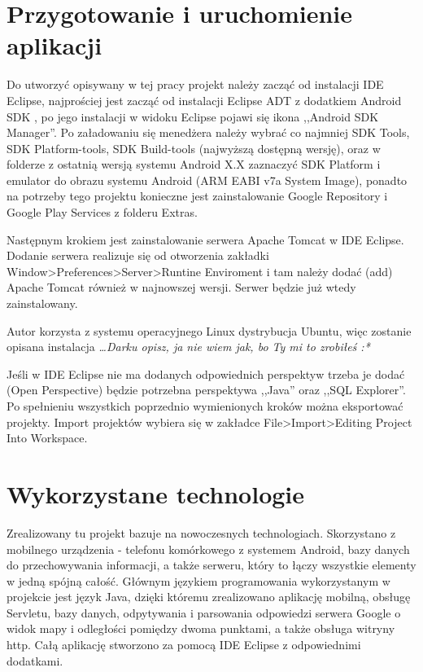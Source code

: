 \documentclass[eng,printmode,oneside]{mgr}
\begin{document}
\chapter{Przygotowanie i uruchomienie aplikacji}

Do utworzyć opisywany w tej pracy projekt należy zacząć od instalacji IDE
Eclipse,  najprościej jest zacząć od instalacji Eclipse ADT z dodatkiem Android
SDK \cite{eclipse}, po jego instalacji w widoku Eclipse pojawi się ikona
,,Android SDK Manager''. Po załadowaniu się menedżera należy wybrać co najmniej
SDK Tools, SDK Platform-tools, SDK Build-tools (najwyższą dostępną wersję), oraz w
folderze z ostatnią wersją systemu Android X.X zaznaczyć SDK Platform i
emulator do obrazu systemu Android (ARM EABI v7a System Image), ponadto na
potrzeby tego projektu konieczne jest zainstalowanie Google Repository i Google
Play Services z folderu Extras.

Następnym krokiem jest zainstalowanie serwera Apache Tomcat w IDE Eclipse.
Dodanie serwera realizuje się od otworzenia zakładki
Window>Preferences>Server>Runtine Enviroment i tam należy dodać (add) Apache
Tomcat również w najnowszej wersji. Serwer będzie już wtedy zainstalowany. 

Autor korzysta z systemu operacyjnego Linux dystrybucja Ubuntu, więc zostanie
opisana instalacja \emph{\color{komentarz}\ldots Darku opisz, ja nie wiem jak,
bo Ty mi to zrobiłeś :*}

Jeśli w IDE Eclipse nie ma dodanych odpowiednich perspektyw trzeba je dodać
(Open Perspective) będzie potrzebna perspektywa ,,Java'' oraz ,,SQL Explorer''.
Po spełnieniu wszystkich poprzednio wymienionych kroków można eksportować
projekty. Import projektów wybiera się w zakładce File>Import>Editing Project
Into Workspace.

\chapter{Wykorzystane technologie}

Zrealizowany tu projekt bazuje na nowoczesnych technologiach.
Skorzystano z mobilnego urządzenia - telefonu komórkowego z systemem
Android, bazy danych do przechowywania informacji, a także serweru, który to
łączy wszystkie elementy w jedną spójną całość. Głównym językiem
programowania wykorzystanym w projekcie jest język Java, dzięki któremu
zrealizowano aplikację mobilną, obsługę Servletu, bazy danych, odpytywania i
parsowania odpowiedzi serwera Google o widok mapy i odległości pomiędzy dwoma
punktami, a także obsługa witryny http. Całą aplikację stworzono za pomocą IDE
Eclipse z odpowiednimi dodatkami.
\end{document}
